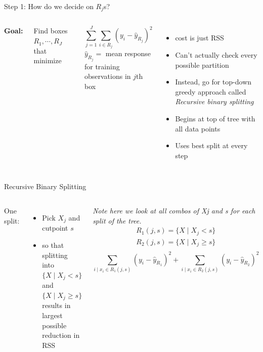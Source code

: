 \documentclass[aspectratio=169,usenames,dvipsnames]{beamer}
\newcommand{\InstructorNotes}[1]{\textit{\color{orange}#1}}
\newcommand{\InstructorList}[1]{
\begin{itemize}
	\color{orange}
	#1
\end{itemize}
}
\begin{document}
\begin{frame}[c]{Step 1: How do we decide on $R_j$s?}

\begin{columns}
\centering
\textbf{Goal:}

Find boxes $R_1,\cdots,R_J$ that minimize

\begin{equation*}
	\sum_{j=1}^J \sum_{i \in R_j} (y_i-\hat y_{R_j})^2
\end{equation*}
$\hat y_{R_j} = $ mean response for training observations in $j$th box

\centering
\InstructorList{
	\item cost is just RSS
  \item Can't actually check every possible partition
	\item Instead, go for top-down greedy approach called \textit{Recursive binary splitting}
	\item Begins at top of tree with all data points
	\item Uses best split at every step
}

\end{columns}

\end{frame}
\begin{frame}[t]{Recursive Binary Splitting}

\begin{columns}
One split:

\centering
\begin{itemize}
	\item Pick $X_j$ and cutpoint $s$ 
  \item so that splitting into $\{X \mid X_j < s\}$ and $\{X \mid X_j \geq s\}$ results in largest possible reduction in RSS
\end{itemize}

\InstructorNotes{Note here we look at all combos of Xj and s for each split of the tree.}
\centering
\begin{align*}
	R_1(j,s) = \{X \mid X_j < s\}\\
	R_2(j,s) = \{X \mid X_j \geq s\}\\
\end{align*}
\begin{equation*}
	\sum_{i \mid x_i \in R_1(j,s)}(y_i - \hat y _{R_1})^2
	+
	\sum_{i \mid x_i \in R_2(j,s)}(y_i - \hat y _{R_2})^2
\end{equation*}
\end{columns}

\end{frame}
\end{document}

